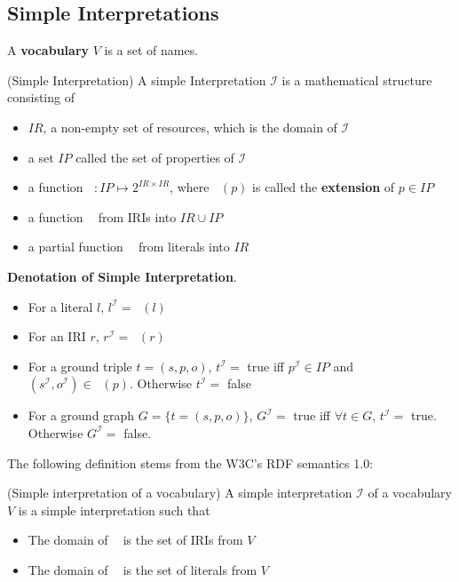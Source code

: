 \documentclass{article}
\DeclareMathOperator{\IEXT}{I_{EXT}}
\DeclareMathOperator{\IL}{I_{L}}
\DeclareMathOperator{\IS}{I_{S}}
\begin{document}
\subsection{Simple Interpretations}

\begin{defin}
A \textbf{vocabulary} $V$ is a set of names.
\end{defin}

\begin{defin}(Simple Interpretation)\newline
A simple Interpretation $\mathcal{I}$ is a mathematical structure consisting of
\begin{itemize}
\item $IR$, a non-empty set of resources, which is the domain of $\mathcal{I}$
\item a set $IP$ called the set of properties of $\mathcal{I}$
\item a function $\IEXT:IP \mapsto 2^{IR \times IR}$, where $\IEXT(p)$ is called the \textbf{extension} of $p \in IP$
\item a function $\IS$ from IRIs  into $IR \cup IP$
\item a partial function $\IL$ from literals into $IR$
\end{itemize}
\end{defin}

\textbf{Denotation of Simple Interpretation}.
\begin{itemize}
\item For a literal $l$, $l^{\mathcal{I}} = \IL(l)$
\item For an IRI $r$, $r^{\mathcal{I}} = \IS(r)$
\item For a ground triple $t = (s,p,o)$, $t^{\mathcal{I}} = $ true iff $p^{\mathcal{I}} \in IP$ and $(s^{\mathcal{I}}, o^{\mathcal{I}}) \in \IEXT(p)$. Otherwise $t^{\mathcal{I}} =  $ false
\item For a ground graph $G = \{t = (s,p,o)\}$, $G^{\mathcal{I}} = $ true iff $\forall t \in G$, $t^{\mathcal{I}} = $ true. Otherwise $G^{\mathcal{I}} = $ false.
\end{itemize}

The following definition stems from the W3C's RDF semantics 1.0:
\begin{defin}(Simple interpretation of a vocabulary)\newline
A simple interpretation $\mathcal{I}$ of a vocabulary $V$ is a simple interpretation such that
\begin{itemize}
\item The domain of $\IS$ is the set of IRIs from $V$
\item The domain of $\IL$ is the set of literals from $V$
\end{itemize}

\end{defin}
\end{document}

